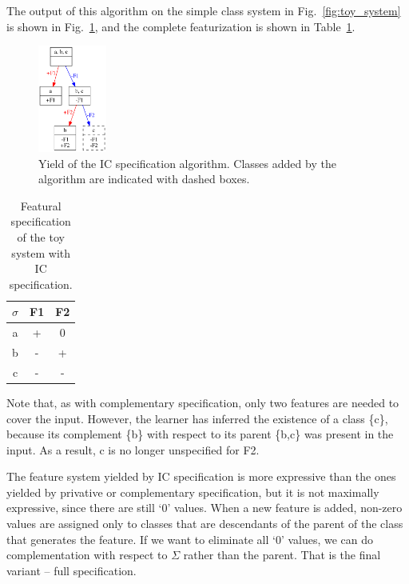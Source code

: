 \documentclass[12pt, oneside]{article}   	%
\begin{document}
The output of this algorithm on the simple class system in Fig.~\ref{fig:toy_system} is shown in Fig.~\ref{fig:toy_system_ic}, and the complete featurization is shown in Table~\ref{table:toy_system_ic}. 

\begin{figure}[htb!]
	\centering
	\includegraphics[width=0.2\textwidth]{toy_system_ic.png}
	\caption{Yield of the IC specification algorithm. Classes added by the algorithm are indicated with dashed boxes.}
	\label{fig:toy_system_ic}
\end{figure}

\begin{table}[h]
	\centering
	\begin{tabular} {|c||c|c|}
		\hline
		$\sigma$ & F1 & F2 \\ \hline
		a & + & 0 \\
		b & - & + \\
		c & - & - \\
		\hline
	\end{tabular}
	\caption{Featural specification of the toy system with IC specification.}
	\label{table:toy_system_ic}
\end{table}

Note that, as with complementary specification, only two features are needed to cover the input. However, the learner has inferred the existence of a class \{c\}, because its complement \{b\} with respect to its parent \{b,c\} was present in the input. As a result, c is no longer unspecified for F2.

The feature system yielded by IC specification is more expressive than the ones yielded by privative or complementary specification, but it is not maximally expressive, since there are still `$0$' values. When a new feature is added, non-zero values are assigned only to classes that are descendants of the parent of the class that generates the feature. If we want to eliminate all `$0$' values, we can do complementation with respect to $\Sigma$ rather than the parent. That is the final variant -- full specification.

\FloatBarrier
\end{document}
